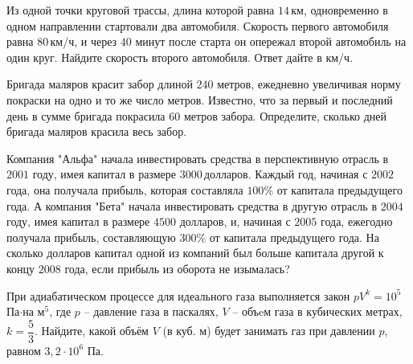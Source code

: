 %
%
%
%
\begin{homework}[number=2]
	\begin{listofex}
		\item Из одной точки круговой трассы, длина которой равна \( 14 \) км, одновременно в одном направлении стартовали два автомобиля. Скорость первого автомобиля равна \( 80 \) км/ч, и через \( 40 \) минут после старта он опережал второй автомобиль на один круг. Найдите скорость второго автомобиля. Ответ дайте в км/ч.
		\item Бригада маляров красит забор длиной \( 240 \) метров, ежедневно увеличивая норму покраски на одно и то же число метров. Известно, что за первый и последний день в сумме бригада покрасила \( 60 \) метров забора. Определите, сколько дней бригада маляров красила весь забор.
		\item Компания "Альфа" начала инвестировать средства в перспективную отрасль в \( 2001 \) году, имея капитал в размере \( 3000 \) долларов. Каждый год, начиная с \( 2002 \) года, она получала прибыль, которая составляла \( 100\% \) от капитала предыдущего года. А компания "Бета" начала инвестировать средства в другую отрасль в \( 2004 \) году, имея капитал в размере \( 4500 \) долларов, и, начиная с \( 2005 \) года, ежегодно получала прибыль, составляющую \( 300\% \) от капитала предыдущего года. На сколько долларов капитал одной из компаний был больше капитала другой к концу \( 2008 \) года, если прибыль из оборота не изымалась?
		\item При адиабатическом процессе для идеального газа выполняется закон \( pV^k=10^5 \)  Па\( \cdot \)на м\( ^5 \), где \( p \) -- давление газа в паскалях, \( V \) -- объeм газа в кубических метрах, \( k=\dfrac{5}{3} \).  Найдите, какой объём \( V \) (в куб. м) будет занимать газ при давлении \( p \), равном \( 3,2\cdot10^6 \) Па.
		\item {}
	\end{listofex}
\end{homework}
%
%
